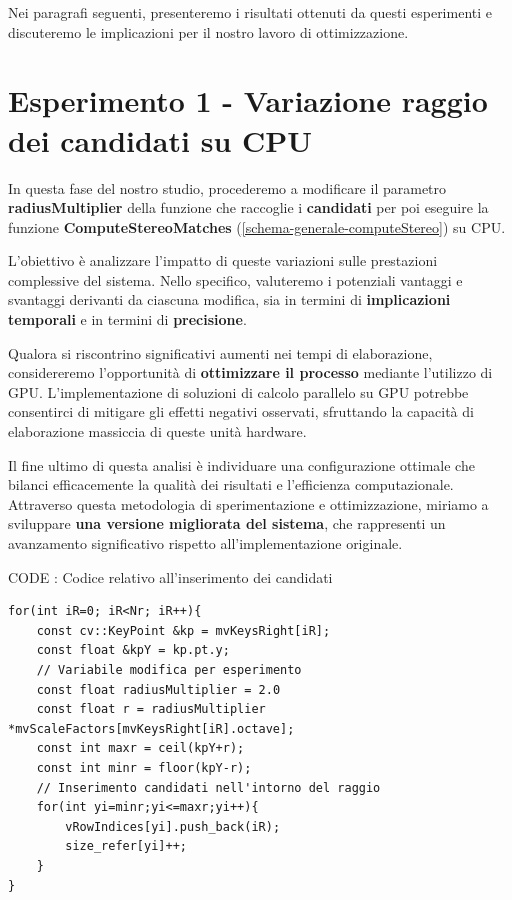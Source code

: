 \documentclass[12pt,a4paper]{report}
\begin{document}
Nei paragrafi seguenti, presenteremo i risultati ottenuti da questi esperimenti e discuteremo le implicazioni per il nostro lavoro di ottimizzazione.

\newpage
\section{Esperimento 1 - Variazione raggio dei candidati su CPU}

In questa fase del nostro studio, procederemo a modificare il parametro \textbf{radiusMultiplier}  della funzione che raccoglie i \textbf{candidati} per poi eseguire la funzione \textbf{ComputeStereoMatches} (\ref{schema-generale-computeStereo}) su CPU. 

L'obiettivo è analizzare l'impatto di queste variazioni sulle prestazioni complessive del sistema. Nello specifico, valuteremo i potenziali vantaggi e svantaggi derivanti da ciascuna modifica, sia in termini di \textbf{implicazioni temporali} e in termini di \textbf{precisione}.

Qualora si riscontrino significativi aumenti nei tempi di elaborazione, considereremo l'opportunità di \textbf{ottimizzare il processo} mediante l'utilizzo di GPU. L'implementazione di soluzioni di calcolo parallelo su GPU potrebbe consentirci di mitigare gli effetti negativi osservati, sfruttando la capacità di elaborazione massiccia di queste unità hardware.

Il fine ultimo di questa analisi è individuare una configurazione ottimale che bilanci efficacemente la qualità dei risultati e l'efficienza computazionale. Attraverso questa metodologia di sperimentazione e ottimizzazione, miriamo a sviluppare \textbf{una versione migliorata del sistema}, che rappresenti un avanzamento significativo rispetto all'implementazione originale.

\vspace{1cm}

CODE : Codice relativo all'inserimento dei candidati
\begin{lstlisting}
for(int iR=0; iR<Nr; iR++){
    const cv::KeyPoint &kp = mvKeysRight[iR];
    const float &kpY = kp.pt.y;
    // Variabile modifica per esperimento
    const float radiusMultiplier = 2.0 
    const float r = radiusMultiplier *mvScaleFactors[mvKeysRight[iR].octave];  
    const int maxr = ceil(kpY+r);
    const int minr = floor(kpY-r);
    // Inserimento candidati nell'intorno del raggio
    for(int yi=minr;yi<=maxr;yi++){
        vRowIndices[yi].push_back(iR);
        size_refer[yi]++;   
    }
}
\end{lstlisting}
\end{document}
